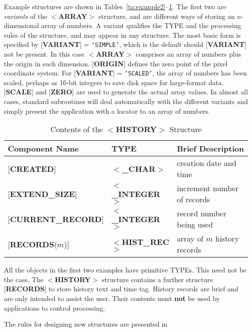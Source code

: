 Example structures are shown in
Tables~\ref{ta:example2}--\ref{ta:example4}.
The first two are {\it variants} of the $<${\bf ARRAY}$>$
structure, and are different ways of storing an $n$-dimensional array of
numbers.  A variant qualifies the TYPE and the processing rules of the
structure, and may appear in any structure.  The most basic form is
specified by
{[}{\bf VARIANT}{]} = {\tt `SIMPLE'}, which is the default should
{[}{\bf VARIANT}{]} not be
present. In this case $<${\bf ARRAY}$>$ comprises an
array of numbers plus the origin in each
dimension. {[}{\bf ORIGIN}{]} defines the zero point of the
pixel coordinate system. For {[}{\bf VARIANT}{]} = {\tt `SCALED'},
the array of numbers has been
scaled, perhaps as 16-bit integers to save disk space for large-format
data.  {[}{\bf SCALE}{]} and {[}{\bf ZERO}{]} are used to generate the
actual array values. 
In almost all cases, standard subroutines will deal automatically
with the different variants and
simply present the application with a locator to an array of numbers. 

\begin{table}[htb]
\centering
\caption{Contents of the $<${\bf HISTORY}$>$ Structure}
\label{ta:example4}
\begin{tabular}{|l|l|l|}
\hline
Component Name & TYPE & Brief Description \\ \hline
{[}{\bf CREATED}{]} & $<${\bf \_CHAR}$>$ & creation date and time \\
{[}{\bf EXTEND\_SIZE}{]} & $<${\bf \_INTEGER}$>$ & increment number of records \\
{[}{\bf CURRENT\_RECORD}{]} & $<${\bf \_INTEGER}$>$ & record number being used \\
{[}{\bf RECORDS}($m$){]} & $<${\bf HIST\_REC}$>$ & array of $m$ history records \\ \hline
\end{tabular}
\end{table}

All the objects in the first two examples have primitive TYPEs.  This
need not be the case.  The $<${\bf HISTORY}$>$ structure contains a further
structure {[}{\bf RECORDS}{]} to store history text and time tag. History
records are brief and are only intended to assist the user.  Their
contents must {\bf not} be used by applications to
control processing.

The rules for designing new structures are presented in

